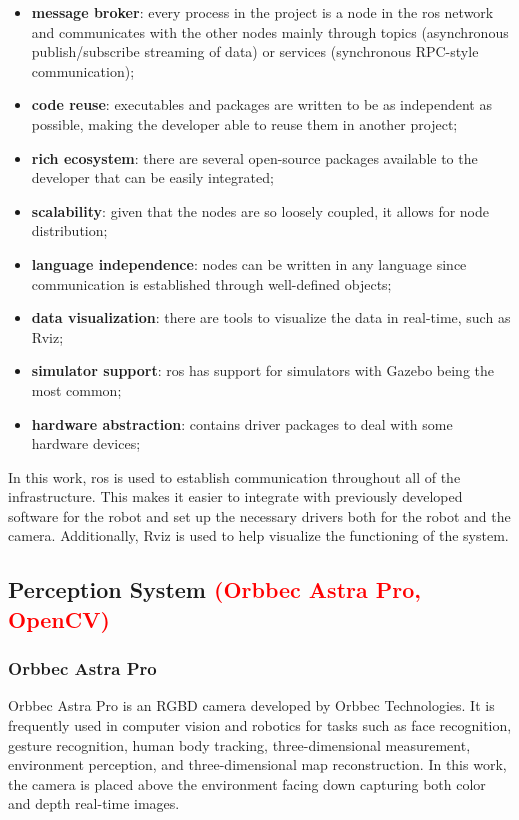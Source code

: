 \begin{itemize}
    \item \textbf{message broker}: every process in the project is a node in the \acs{ros} network and communicates with the other nodes mainly through topics (asynchronous publish/subscribe streaming of data) or services (synchronous RPC-style communication);
    \item \textbf{code reuse}: executables and packages are written to be as independent as possible, making the developer able to reuse them in another project;
    \item \textbf{rich ecosystem}: there are several open-source packages available to the developer that can be easily integrated;
    \item \textbf{scalability}: given that the nodes are so loosely coupled, it allows for node distribution;
    \item \textbf{language independence}: nodes can be written in any language since communication is established through well-defined objects;
    \item \textbf{data visualization}: there are tools to visualize the data in real-time, such as Rviz;
    \item \textbf{simulator support}: \acs{ros} has support for simulators with Gazebo being the most common;
    \item \textbf{hardware abstraction}: contains driver packages to deal with some hardware devices;
\end{itemize}

In this work, \acs{ros} is used to establish communication throughout all of the infrastructure. This makes it easier to integrate with previously developed software for the robot and set up the necessary drivers both for the robot and the camera. Additionally, Rviz is used to help visualize the functioning of the system.

\subsection{Perception System \textcolor{red}{(Orbbec Astra Pro, OpenCV)}}

\subsubsection{Orbbec Astra Pro}

Orbbec Astra Pro is an RGBD camera developed by Orbbec Technologies. It is frequently used in computer vision and robotics for tasks such as face recognition, gesture recognition, human body tracking, three-dimensional measurement, environment perception, and three-dimensional map reconstruction\cite{AstraPro}. In this work, the camera is placed above the environment facing down capturing both color and depth real-time images.

